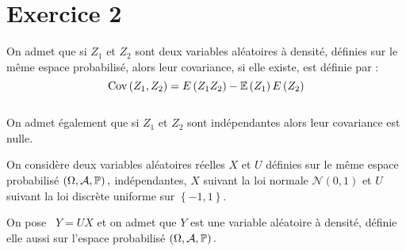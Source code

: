 \documentclass[11pt]{article}%
\begin{document}
\section*{Exercice 2}

On admet que si $Z_{1}$ et $Z_{2}$ sont deux variables aléatoires à
densité, définies sur le même espace probabilisé, alors leur
covariance, si elle existe, est définie par :
\[
\mathrm{Cov}\left( Z_{1},Z_{2}\right) = E\left( Z_{1}Z_{2}\right)
-\mathbb{E}\left(
Z_{1}\right) E\left( Z_{2}\right)
\]
\\
On admet également que si $Z_{1}$ et $Z_{2}$ sont indépendantes
alors leur covariance est nulle.

On considère deux variables aléatoires réelles $X$ et $U$ définies sur
le même espace probabilisé $\left( \Omega,\mathcal{A},\mathbb{P}\right),$
indépendantes, $X$ suivant la loi normale $\mathcal{N}\left( 0,1\right)
$ et $U$ suivant la loi discrète uniforme sur $\left\{ -1,1\right\}.$

On pose \ $Y = UX$ et on admet que $Y$ est une variable aléatoire à
densité, définie elle aussi sur l'espace probabilisé $\left(
\Omega,\mathcal{A},\mathbb{P}\right).$
\end{document}
